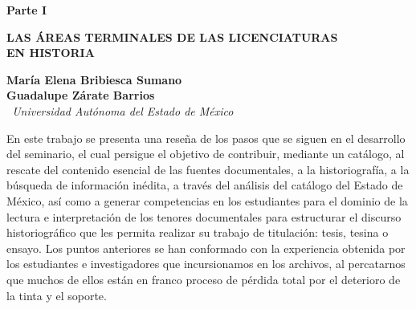 \markboth{}{}
\thispagestyle{empty}
\phantom{abc}

\vspace{0.35\textheight}
{\centering \bfseries Parte I\par}
{\centering \bfseries LAS ÁREAS TERMINALES DE LAS LICENCIATURAS\\ EN HISTORIA \par}
\markboth{}{}
\thispagestyle{empty}	
\cleardoublepage{}
\thispagestyle{empty}	
{}

\bigskip
\begin{center}
{\bfseries María Elena Bribiesca Sumano\\
Guadalupe Zárate Barrios}\\
{\itshape\ Universidad Autónoma del Estado de México\/}
\end{center}

\bigskip
\phantom{abc}\par

\smallskip
{}

\noindent En este trabajo se presenta una reseña de los pasos que se
siguen en el desarrollo del seminario, el cual persigue el objetivo de
contribuir, mediante un catálogo, al rescate del contenido esencial de
las fuentes documentales, a la historiografía, a la búsqueda de
información inédita, a través del análisis del catálogo del Estado de
México, así como a generar competencias en los estudiantes para el dominio
de la lectura e interpretación de los tenores documentales para
estructurar el discurso historiográfico que les permita realizar su
trabajo de titulación: tesis, tesina o ensayo. Los puntos anteriores se han 
conformado con la experiencia obtenida por los estudiantes e investigadores 
que incursionamos en los archivos, al percatarnos que muchos de ellos están 
en franco proceso de pérdida total por el deterioro de la tinta y el soporte.

